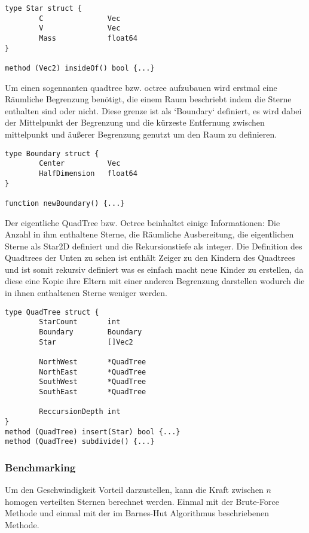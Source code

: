 \begin{lstlisting}
type Star struct {
        C               Vec
        V               Vec
        Mass            float64
}

method (Vec2) insideOf() bool {...}
\end{lstlisting}

Um einen sogennanten quadtree bzw. octree aufzubauen wird erstmal eine
Räumliche Begrenzung benötigt, die einem Raum beschriebt indem die Sterne
enthalten sind oder nicht.  Diese grenze ist als `Boundary` definiert, es wird
dabei der Mittelpunkt der Begrenzung und die kürzeste Entfernung zwischen
mittelpunkt und äußerer Begrenzung genutzt um den Raum zu definieren.

\begin{lstlisting}
type Boundary struct {
        Center          Vec
        HalfDimension   float64
}

function newBoundary() {...}
\end{lstlisting}

Der eigentliche QuadTree bzw. Octree beinhaltet einige Informationen: Die
Anzahl in ihm enthaltene Sterne, die Räumliche Ausbereitung, die eigentlichen
Sterne als Star2D definiert und die Rekursionstiefe als integer. Die Definition
des Quadtrees der Unten zu sehen ist enthält Zeiger zu den Kindern des
Quadtrees und ist somit rekursiv definiert was es einfach macht neue Kinder zu
erstellen, da diese eine Kopie ihre Eltern mit einer anderen Begrenzung
darstellen wodurch die in ihnen enthaltenen Sterne weniger werden.

\begin{lstlisting}
type QuadTree struct {
        StarCount       int
        Boundary        Boundary
        Star            []Vec2

        NorthWest       *QuadTree
        NorthEast       *QuadTree
        SouthWest       *QuadTree
        SouthEast       *QuadTree

        ReccursionDepth int
}
method (QuadTree) insert(Star) bool {...}
method (QuadTree) subdivide() {...}
\end{lstlisting}

\subsubsection{Benchmarking}

Um den Geschwindigkeit Vorteil darzustellen, kann die Kraft zwischen \(n\)
homogen verteilten Sternen berechnet werden. Einmal mit der Brute-Force Methode
und einmal mit der im Barnes-Hut Algorithmus beschriebenen Methode.

